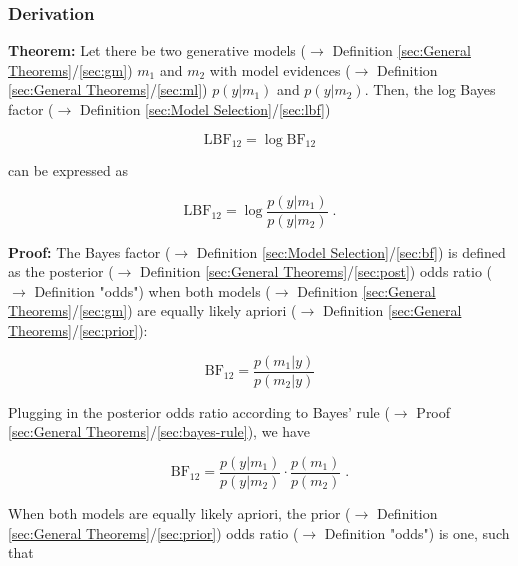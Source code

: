 \documentclass[a4paper,12pt,twoside]{book}
\begin{document}
\subsubsection[\textbf{Derivation}]{Derivation} \label{sec:lbf-der}
\setcounter{equation}{0}

\textbf{Theorem:} Let there be two generative models ($\rightarrow$ Definition \ref{sec:General Theorems}/\ref{sec:gm}) $m_1$ and $m_2$ with model evidences ($\rightarrow$ Definition \ref{sec:General Theorems}/\ref{sec:ml}) $p(y \vert m_1)$ and $p(y \vert m_2)$. Then, the log Bayes factor ($\rightarrow$ Definition \ref{sec:Model Selection}/\ref{sec:lbf})

\begin{equation} \label{eq:lbf-der-LBF-term}
\mathrm{LBF}_{12} = \log \mathrm{BF}_{12}
\end{equation}

can be expressed as

\begin{equation} \label{eq:lbf-der-LBF-ratio}
\mathrm{LBF}_{12} = \log \frac{p(y|m_1)}{p(y|m_2)} \; .
\end{equation}


\vspace{1em}
\textbf{Proof:} The Bayes factor ($\rightarrow$ Definition \ref{sec:Model Selection}/\ref{sec:bf}) is defined as the posterior ($\rightarrow$ Definition \ref{sec:General Theorems}/\ref{sec:post}) odds ratio ($\rightarrow$ Definition "odds") when both models ($\rightarrow$ Definition \ref{sec:General Theorems}/\ref{sec:gm}) are equally likely apriori ($\rightarrow$ Definition \ref{sec:General Theorems}/\ref{sec:prior}):

\begin{equation} \label{eq:lbf-der-BF-s1}
\mathrm{BF}_{12} = \frac{p(m_1|y)}{p(m_2|y)}
\end{equation}

Plugging in the posterior odds ratio according to Bayes' rule ($\rightarrow$ Proof \ref{sec:General Theorems}/\ref{sec:bayes-rule}), we have

\begin{equation} \label{eq:lbf-der-BF-s2}
\mathrm{BF}_{12} = \frac{p(y|m_1)}{p(y|m_2)} \cdot \frac{p(m_1)}{p(m_2)} \; .
\end{equation}

When both models are equally likely apriori, the prior ($\rightarrow$ Definition \ref{sec:General Theorems}/\ref{sec:prior}) odds ratio ($\rightarrow$ Definition "odds") is one, such that
\end{document}
